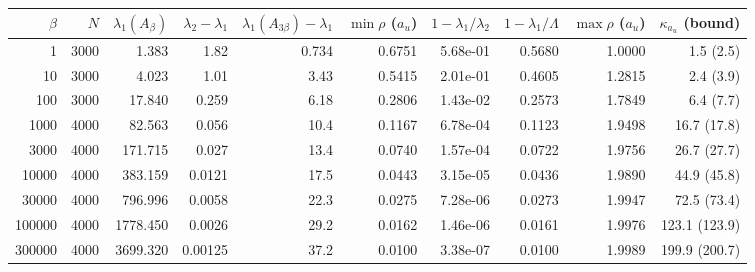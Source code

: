 \begin{tabular}{rrrrrrrrrr}
\toprule
$\beta$ & $N$ & $\lambda_1(A_\beta)$ & $\lambda_2-\lambda_1$ & $\lambda_1(A_{3\beta})-\lambda_1$ & $\min\rho$ ($a_u$) & $1-\lambda_1/\lambda_2$ & $1-\lambda_1/\Lambda$ & $\max\rho$ ($a_u$) & $\kappa_{a_u}$ (bound) \\
\midrule
1 & 3000 & 1.383 & 1.82 & 0.734 & 0.6751 & 5.68e-01 & 0.5680 & 1.0000 & 1.5 (2.5) \\
10 & 3000 & 4.023 & 1.01 & 3.43 & 0.5415 & 2.01e-01 & 0.4605 & 1.2815 & 2.4 (3.9) \\
100 & 3000 & 17.840 & 0.259 & 6.18 & 0.2806 & 1.43e-02 & 0.2573 & 1.7849 & 6.4 (7.7) \\
1000 & 4000 & 82.563 & 0.056 & 10.4 & 0.1167 & 6.78e-04 & 0.1123 & 1.9498 & 16.7 (17.8) \\
3000 & 4000 & 171.715 & 0.027 & 13.4 & 0.0740 & 1.57e-04 & 0.0722 & 1.9756 & 26.7 (27.7) \\
10000 & 4000 & 383.159 & 0.0121 & 17.5 & 0.0443 & 3.15e-05 & 0.0436 & 1.9890 & 44.9 (45.8) \\
30000 & 4000 & 796.996 & 0.0058 & 22.3 & 0.0275 & 7.28e-06 & 0.0273 & 1.9947 & 72.5 (73.4) \\
100000 & 4000 & 1778.450 & 0.0026 & 29.2 & 0.0162 & 1.46e-06 & 0.0161 & 1.9976 & 123.1 (123.9) \\
300000 & 4000 & 3699.320 & 0.00125 & 37.2 & 0.0100 & 3.38e-07 & 0.0100 & 1.9989 & 199.9 (200.7) \\
\bottomrule
\end{tabular}
